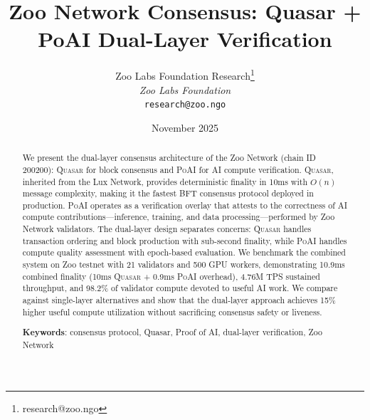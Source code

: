 \documentclass[11pt,letterpaper]{article}
\title{\textbf{Zoo Network Consensus: Quasar + PoAI Dual-Layer Verification}}
\author{
Zoo Labs Foundation Research\thanks{research@zoo.ngo}\\
\textit{Zoo Labs Foundation}\\
\texttt{research@zoo.ngo}
}
\date{November 2025}
\newcommand{\PoAI}{\textsc{PoAI}}
\newcommand{\Quasar}{\textsc{Quasar}}
\begin{document}
\zoocoverpage

\begin{abstract}
We present the dual-layer consensus architecture of the Zoo Network (chain ID 200200): \Quasar{} for block consensus and \PoAI{} for AI compute verification. \Quasar{}, inherited from the Lux Network, provides deterministic finality in 10ms with $O(n)$ message complexity, making it the fastest BFT consensus protocol deployed in production. \PoAI{} operates as a verification overlay that attests to the correctness of AI compute contributions---inference, training, and data processing---performed by Zoo Network validators. The dual-layer design separates concerns: \Quasar{} handles transaction ordering and block production with sub-second finality, while \PoAI{} handles compute quality assessment with epoch-based evaluation. We benchmark the combined system on Zoo testnet with 21 validators and 500 GPU workers, demonstrating 10.9ms combined finality (10ms \Quasar{} + 0.9ms \PoAI{} overhead), 4.76M TPS sustained throughput, and 98.2\% of validator compute devoted to useful AI work. We compare against single-layer alternatives and show that the dual-layer approach achieves 15\% higher useful compute utilization without sacrificing consensus safety or liveness.

\textbf{Keywords}: consensus protocol, Quasar, Proof of AI, dual-layer verification, Zoo Network
\end{abstract}












\end{document}
